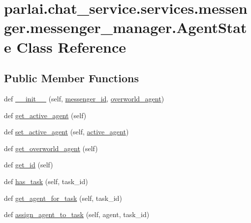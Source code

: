 \hypertarget{classparlai_1_1chat__service_1_1services_1_1messenger_1_1messenger__manager_1_1AgentState}{}\section{parlai.\+chat\+\_\+service.\+services.\+messenger.\+messenger\+\_\+manager.\+Agent\+State Class Reference}
\label{classparlai_1_1chat__service_1_1services_1_1messenger_1_1messenger__manager_1_1AgentState}
\subsection*{Public Member Functions}
\begin{DoxyCompactItemize}
\item 
def \hyperlink{classparlai_1_1chat__service_1_1services_1_1messenger_1_1messenger__manager_1_1AgentState_ae384b64f65b58e2f8d9bee51af89f6cc}{\+\_\+\+\_\+init\+\_\+\+\_\+} (self, \hyperlink{classparlai_1_1chat__service_1_1services_1_1messenger_1_1messenger__manager_1_1AgentState_ae08b5a025e6c6dbc13d69fb51cfc88ae}{messenger\+\_\+id}, \hyperlink{classparlai_1_1chat__service_1_1services_1_1messenger_1_1messenger__manager_1_1AgentState_a8a15c91823a40220f26bcea350841515}{overworld\+\_\+agent})
\item 
def \hyperlink{classparlai_1_1chat__service_1_1services_1_1messenger_1_1messenger__manager_1_1AgentState_a487258dba5d31c303dc4f09d6261aea6}{get\+\_\+active\+\_\+agent} (self)
\item 
def \hyperlink{classparlai_1_1chat__service_1_1services_1_1messenger_1_1messenger__manager_1_1AgentState_a33f7fbb94a33fb890c3dcc2b8d38f740}{set\+\_\+active\+\_\+agent} (self, \hyperlink{classparlai_1_1chat__service_1_1services_1_1messenger_1_1messenger__manager_1_1AgentState_a0ab28992a20b4b8993f8a2d6df3eb3bc}{active\+\_\+agent})
\item 
def \hyperlink{classparlai_1_1chat__service_1_1services_1_1messenger_1_1messenger__manager_1_1AgentState_a58d7f5ee92406398cb1a48c31dc5f698}{get\+\_\+overworld\+\_\+agent} (self)
\item 
def \hyperlink{classparlai_1_1chat__service_1_1services_1_1messenger_1_1messenger__manager_1_1AgentState_aeb7f034a2bfe014172f0a5f127af2bae}{get\+\_\+id} (self)
\item 
def \hyperlink{classparlai_1_1chat__service_1_1services_1_1messenger_1_1messenger__manager_1_1AgentState_a508037777019a09944a08bd3cc204dbb}{has\+\_\+task} (self, task\+\_\+id)
\item 
def \hyperlink{classparlai_1_1chat__service_1_1services_1_1messenger_1_1messenger__manager_1_1AgentState_a624cdfd85ad220592fc8d59b72ec3f24}{get\+\_\+agent\+\_\+for\+\_\+task} (self, task\+\_\+id)
\item 
def \hyperlink{classparlai_1_1chat__service_1_1services_1_1messenger_1_1messenger__manager_1_1AgentState_aa2725665344abde7cb032e6b5ebaa324}{assign\+\_\+agent\+\_\+to\+\_\+task} (self, agent, task\+\_\+id)
\end{DoxyCompactItemize}
